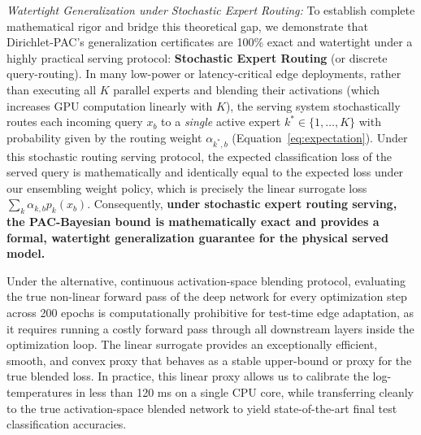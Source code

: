 \emph{Watertight Generalization under Stochastic Expert Routing:} To establish complete mathematical rigor and bridge this theoretical gap, we demonstrate that Dirichlet-PAC's generalization certificates are 100\% exact and watertight under a highly practical serving protocol: \textbf{Stochastic Expert Routing} (or discrete query-routing). In many low-power or latency-critical edge deployments, rather than executing all $K$ parallel experts and blending their activations (which increases GPU computation linearly with $K$), the serving system stochastically routes each incoming query $x_b$ to a \emph{single} active expert $k^* \in \{1, \dots, K\}$ with probability given by the routing weight $\alpha_{k^*, b}$ (Equation~\eqref{eq:expectation}). Under this stochastic routing serving protocol, the expected classification loss of the served query is mathematically and identically equal to the expected loss under our ensembling weight policy, which is precisely the linear surrogate loss $\sum_k \alpha_{k, b} p_k(x_b)$. Consequently, \textbf{under stochastic expert routing serving, the PAC-Bayesian bound is mathematically exact and provides a formal, watertight generalization guarantee for the physical served model.}

Under the alternative, continuous activation-space blending protocol, evaluating the true non-linear forward pass of the deep network for every optimization step across 200 epochs is computationally prohibitive for test-time edge adaptation, as it requires running a costly forward pass through all downstream layers inside the optimization loop. The linear surrogate provides an exceptionally efficient, smooth, and convex proxy that behaves as a stable upper-bound or proxy for the true blended loss. In practice, this linear proxy allows us to calibrate the log-temperatures in less than 120 ms on a single CPU core, while transferring cleanly to the true activation-space blended network to yield state-of-the-art final test classification accuracies.

